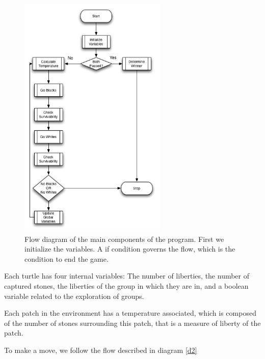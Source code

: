 \documentclass[a4paper,10pt,twocolumn]{article}
\begin{document}
\begin{CJK*}{UTF8}{gbsn}
\begin{figure}[!ht]
\begin{center}
\includegraphics[width=7cm]{df.png}
\caption{\footnotesize {Flow diagram of the main components of the program.} First we initialize the variables. A if condition governs the flow, which is the condition to end the game.  \label{d1}}
\end{center}
\end{figure}

Each turtle has four internal variables: The number of liberties, the number of captured stones, the liberties of the group in which they are in, and a boolean variable related to the exploration of groups. 
 
Each patch in the environment has a temperature associated, which is composed of the number of stones surrounding this patch, that is a measure of liberty of the patch. 

To make a move, we follow the flow described in diagram \ref{d2}


\end{CJK*}
\end{document}
